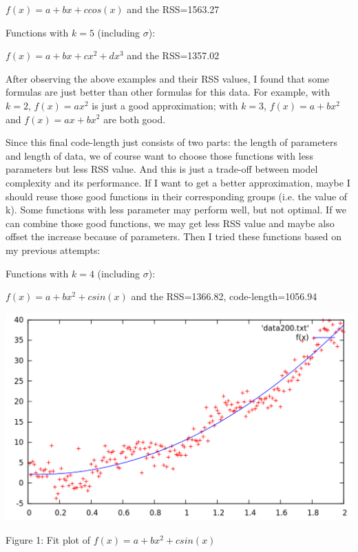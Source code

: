 \documentclass{article}
\begin{document}
$f(x)=a+bx+ccos(x)$ and the RSS=1563.27

\vspace{1mm}

Functions with $k=5$ (including $\sigma$):

$f(x)=a+bx+cx^2+dx^3$ and the RSS=1357.02

\vspace{1mm}

After observing the above examples and their RSS values, I found that some formulas are just better than other formulas for this data. For example, with $k=2$, $f(x)=ax^2$ is just a good approximation; with $k=3$, $f(x)=a+bx^2$ and $f(x)=ax+bx^2$ are both good.

Since this final code-length just consists of two parts: the length of parameters and length of data, we of course want to choose those functions with less parameters but less RSS value. And this is just a trade-off between model complexity and its performance. If I want to get a better approximation, maybe I should reuse those good functions in their corresponding groups (i.e. the value of k). Some functions with less parameter may perform well, but not optimal. If we can combine those good functions, we may get less RSS value and maybe also offset the increase because of parameters. Then I tried these functions based on my previous attempts:

Functions with $k=4$ (including $\sigma$):

\vspace{1mm}

$f(x)=a+bx^2+csin(x)$ and the RSS=1366.82, code-length=1056.94

\vspace{5mm}
\begin{minipage}{0.9\textwidth}
  \includegraphics[width=\textwidth,keepaspectratio]{19.png}
  \centerline{Figure 1: Fit plot of $f(x)=a+bx^2+csin(x)$}
\end{minipage}
\vspace{5mm}
\end{document}
